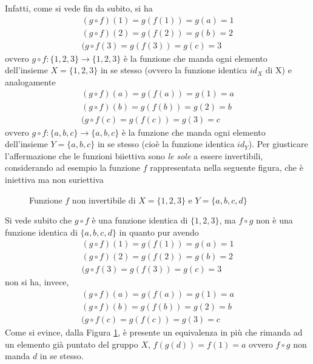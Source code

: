 \documentclass{book}
\theoremstyle{definition}
\theoremstyle{plain}
\begin{document}
Infatti, come si vede fin da subito, si ha
\begin{equation*}
  \begin{matrix}
    (g\circ f)(1)=g(f(1))=g(a)=1\\
    (g\circ f)(2)=g(f(2))=g(b)=2\\
    (g\circ f(3)=g(f(3))=g(c)=3
  \end{matrix}
\end{equation*}
ovvero $g\circ f:\{1,2,3\} \to \{1,2,3\}$ è la funzione che manda ogni elemento dell'insieme
$X=\{1,2,3\}$ in se stesso (ovvero la funzione identica $id_{X}$ di X) e analogamente
\begin{equation*}
  \begin{matrix}
    (g\circ f)(a)=g(f(a))=g(1)=a\\
    (g\circ f)(b)=g(f(b))=g(2)=b\\
    (g\circ f(c)=g(f(c))=g(3)=c
  \end{matrix}
\end{equation*}
ovvero $g\circ f:\{a,b,c\} \to \{a,b,c\}$ è la funzione che manda ogni elemento dell'insieme
$Y=\{a,b,c\}$ in se stesso (cioè la funzione identica $id_Y$). Per giusticare l'affermazione che le
funzioni biiettiva sono \textit{le sole} a essere invertibili, considerando ad esempio la funzione
$f$ rappresentata nella seguente figura, che è iniettiva ma non suriettiva
\clearpage
\begin{figure}[ht!]
  \centering
  \resizebox{15cm}{!}{}
  \caption{Funzione $f$ non invertibile di $X=\{1,2,3\}$ e $Y=\{a,b,c,d\}$}
  \label{fig:Compinveeproddimatrici2}
\end{figure}
Si vede subito che $g\circ f$ è una funzione identica di $\{1,2,3\}$, ma $f\circ g$ non è una funzione identica
di $\{a,b,c,d\}$ in quanto pur avendo
\begin{equation*}
  \begin{matrix}
    (g\circ f)(1)=g(f(1))=g(a)=1\\
    (g\circ f)(2)=g(f(2))=g(b)=2\\
    (g\circ f(3)=g(f(3))=g(c)=3
  \end{matrix}
\end{equation*}
non si ha, invece,
\begin{equation*}
  \begin{matrix}
    (g\circ f)(a)=g(f(a))=g(1)=a\\
    (g\circ f)(b)=g(f(b))=g(2)=b\\
    (g\circ f(c)=g(f(c))=g(3)=c
  \end{matrix}
\end{equation*}
Come si evince, dalla Figura \ref{fig:Compinveeproddimatrici2}, è presente un equivalenza in più che rimanda
ad un elemento già puntato del gruppo $X$, $f(g(d))=f(1)=a$ ovvero $f\circ g$ non manda $d$ in se stesso.
\end{document}
